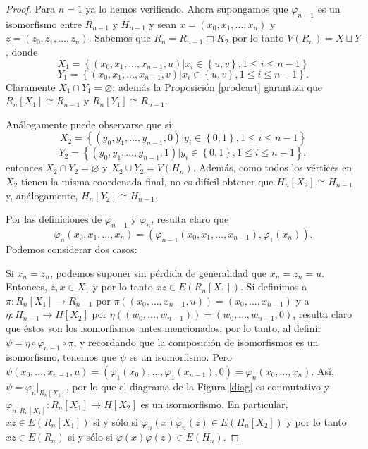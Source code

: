 \begin{proof}
    Para $n=1$ ya lo hemos verificado. Ahora supongamos que $\varphi_{n-1}$ es un isomorfismo entre $R_{n-1}$ y $
    H_{n-1}$ y sean $x = (x_0,x_1, \dots, x_n)$ y $z = (z_0, z_1, \dots, z_n)$. Sabemos que $R_n=R_{n-1} \Box K_2$
    por lo tanto $V(R_n)=X \sqcup Y$, donde $$X_1=\left\{(x_0,x_1, ..., x_{n-1}, u)\big| x_i \in \left\{u,v\right\},
    1 \le i \le n-1 \right\}$$ $$Y_1=\left\{(x_0,x_1, ..., x_{n-1}, v)\big| x_i \in \left\{u,v\right\}, 1 \le i \le
    n-1 \right\}.$$   Claramente $X_1 \cap Y_1 = \varnothing$; adem\'as la Proposici\'on \ref{prodcart} garantiza que
    $R_n[X_1] \cong R_{n-1}$ y $R_n[Y_1] \cong R_{n-1}$.

    An\'alogamente puede observarse que si:
    $$X_2=\left\{(y_0, y_1, \dots, y_{n-1},0) \big| y_i \in \left\{0,1\right\}, 1 \le i \le n-1\right\}$$
    $$Y_2=\left\{(y_0, y_1, \dots, y_{n-1},1) \big| y_i \in \left\{0,1\right\}, 1 \le i \le n-1\right\},$$ entonces
    $X_2 \cap Y_2 = \varnothing$ y $X_2 \cup Y_2= V(H_n)$. Adem\'as, como todos los v\' ertices en $X_2$ tienen la
    misma coordenada final, no es dif\'icil obtener que $H_n [X_2] \cong H_{n-1}$ y, an\' alogamente, $H_n [Y_2]
    \cong H_{n-1}$.

    Por las definiciones de $\varphi_{n-1}$ y $\varphi_n$, resulta claro que $$\varphi_n(x_0,x_1, \dots, x_n) =
    (\varphi_{n-1}(x_0,x_1, \dots, x_{n-1}), \varphi_1(x_n)).$$   Podemos considerar dos casos:

    Si $x_n = z_n$, podemos suponer sin p\'erdida de generalidad que $x_n = z_n = u$. Entonces,  $z,x \in X_1$ y por
    lo tanto $xz \in E(R_n [X_1] )$. Si definimos a $\pi: R_n [X_1] \to R_{n-1}$ por $\pi ( (x_0, \dots, x_{n-1}, u)
    ) = (x_0, \dots, x_{n-1})$ y a $\eta: H_{n-1} \to H [X_2]$ por $\eta ( (w_0, \dots, w_{n-1}) )= (w_0, \dots,
    w_{n-1}, 0)$, resulta claro que \'estos son los isomorfismos antes mencionados, por lo tanto, al definir $\psi =
    \eta \circ \varphi_{n-1} \circ \pi$, y recordando que la composici\'on de isomorfismos es un isomorfismo, tenemos
    que $\psi$ es un isomorfismo. Pero $\psi (x_0, \dots, x_{n-1}, u) = (\varphi_1 (x_0), \dots, \varphi_1 (x_{n-1}),
    0) = \varphi_n (x_0, \dots, x_n)$. As\'i, $\psi = \varphi_n \big|_{R_n [X_1]}$, por lo que el diagrama de la
    Figura \ref{diag} es conmutativo y $\varphi_n \big|_{R_n [X_1]} : R_n [X_1] \to H[X_2]$ es un isormorfismo. En
    particular, $xz \in E(R_n [X_1])$ si y s\' olo si $\varphi_n (x) \varphi_n (z) \in E(H_n [X_2])$ y por lo tanto
    $xz \in E(R_n)$ si y s\'olo si $\varphi(x) \varphi (z) \in E(H_n)$.



\end{proof}
